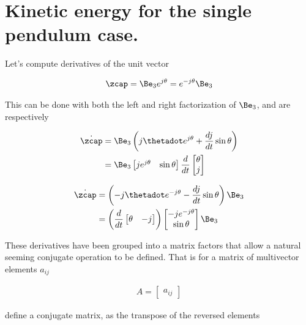 \section{Kinetic energy for the single pendulum case.}

Let's compute derivatives of the unit vector

\begin{align}\label{eqn:sPolarMultiPendulum:zoo2}
\zcap = \Be_3 e^{j\theta} = e^{-j\theta} \Be_3
\end{align}

This can be done with both the left and right factorization of $\Be_3$, and are respectively

\begin{align}\label{eqn:sPolarMultiPendulum:zoo3}
\dot{\zcap} 
&= \Be_3 \left( j \thetadot e^{j\theta} + \frac{dj}{dt} \sin\theta \right) \\
&=
\Be_3
\begin{bmatrix}
j e^{j\theta} & \sin\theta
\end{bmatrix}
\frac{d}{dt} 
\begin{bmatrix}
\theta \\
j
\end{bmatrix}
\end{align}

\begin{align}\label{eqn:sPolarMultiPendulum:zoo4}
\dot{\zcap} &= \left( -j \thetadot e^{-j\theta} - \frac{dj}{dt} \sin\theta \right) \Be_3 \\
&=
\left(
\frac{d}{dt} 
\begin{bmatrix}
\theta & -j
\end{bmatrix}
\right)
\begin{bmatrix}
-j e^{-j\theta} \\
\sin\theta
\end{bmatrix}
\Be_3
\end{align}

These derivatives have been grouped into a matrix factors that allow a natural seeming conjugate operation to be defined.  That is for a matrix of multivector elements $a_{ij}$ 

\begin{align}\label{eqn:sPolarMultiPendulum:zoo5}
A =
\begin{bmatrix}
a_{ij}
\end{bmatrix}
\end{align}

define a conjugate matrix, as the transpose of the reversed elements

